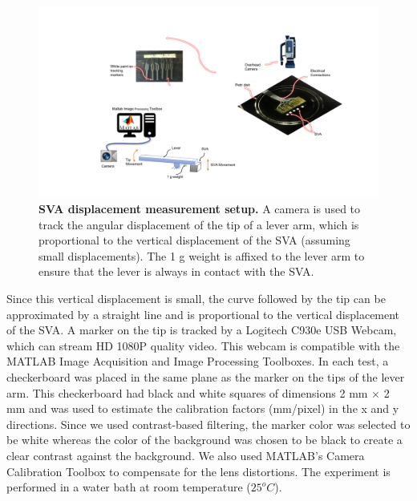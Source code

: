 \begin{figure}[!h]
      \centering
      \includegraphics[width=\textwidth]{swellingTestSetup.pdf}
      \caption[SVA displacement measurement setup]{\textbf{SVA displacement measurement setup.} A camera is used to track the angular displacement of the tip of a lever arm, which is proportional to the vertical displacement of the SVA (assuming small displacements). The 1 g weight is affixed to the lever arm to ensure that the lever is always in contact with the SVA.}
      \label{fig:swellingTestSetup}
\end{figure}

Since this vertical displacement is small, the curve followed by the tip can be approximated by a straight line and is proportional to the vertical displacement of the SVA. A marker on the tip is tracked by a Logitech C930e USB Webcam, which can stream HD 1080P quality video. This webcam is compatible with the MATLAB Image Acquisition and Image Processing Toolboxes. In each test, a checkerboard was placed in the same plane as the marker on the tips of the lever arm. This checkerboard had black and white squares of dimensions 2 mm × 2 mm and was used to estimate the calibration factors (mm/pixel) in the x and y directions. Since we used contrast-based filtering, the marker color was selected to be white whereas the color of the background was chosen to be black to create a clear contrast against the background. We also used MATLAB’s Camera Calibration Toolbox to compensate for the lens distortions. The experiment is performed in a water bath at room temperature ($25^{o}C$).


